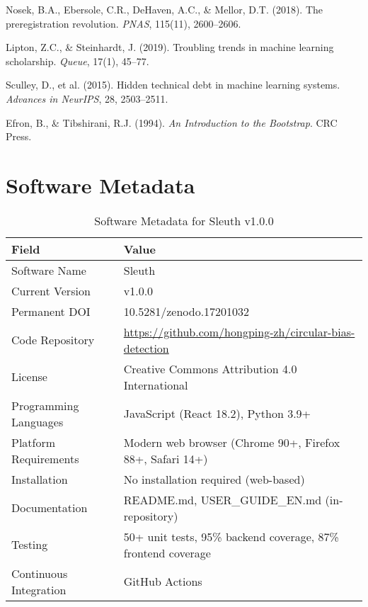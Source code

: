 \documentclass[10pt]{article}
\begin{document}
\begin{thebibliography}{99}
Nosek, B.A., Ebersole, C.R., DeHaven, A.C., \& Mellor, D.T. (2018). The preregistration revolution. \textit{PNAS}, 115(11), 2600--2606.

Lipton, Z.C., \& Steinhardt, J. (2019). Troubling trends in machine learning scholarship. \textit{Queue}, 17(1), 45--77.

Sculley, D., et al. (2015). Hidden technical debt in machine learning systems. \textit{Advances in NeurIPS}, 28, 2503--2511.

Efron, B., \& Tibshirani, R.J. (1994). \textit{An Introduction to the Bootstrap}. CRC Press.

\end{thebibliography}

\appendix

\section*{Software Metadata}

\begin{table}[h]
\centering
\caption{Software Metadata for Sleuth v1.0.0}
\begin{tabular}{ll}
\toprule
\textbf{Field} & \textbf{Value} \\
\midrule
Software Name & Sleuth \\
Current Version & v1.0.0 \\
Permanent DOI & 10.5281/zenodo.17201032 \\
Code Repository & \url{https://github.com/hongping-zh/circular-bias-detection} \\
License & Creative Commons Attribution 4.0 International \\
Programming Languages & JavaScript (React 18.2), Python 3.9+ \\
Platform Requirements & Modern web browser (Chrome 90+, Firefox 88+, Safari 14+) \\
Installation & No installation required (web-based) \\
Documentation & README.md, USER\_GUIDE\_EN.md (in-repository) \\
Testing & 50+ unit tests, 95\% backend coverage, 87\% frontend coverage \\
Continuous Integration & GitHub Actions \\
\bottomrule
\end{tabular}
\end{table}
\end{document}

